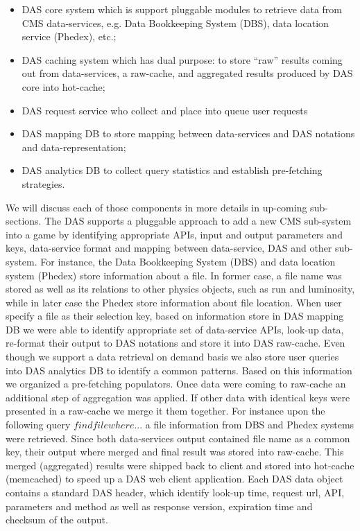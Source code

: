 \documentclass[a4paper]{jpconf}
\begin{document}
\begin{itemize}
\item DAS core system which is support pluggable modules to retrieve data from
CMS data-services, e.g. Data Bookkeeping System (DBS), data location service (Phedex),
etc.;
\item DAS caching system which has dual purpose: to store ``raw'' results coming
out from data-services, a raw-cache, and aggregated results produced by DAS core into
hot-cache;
\item DAS request service who collect and place into queue user requests
\item DAS mapping DB to store mapping between data-services and DAS notations and
data-representation;
\item DAS analytics DB to collect query statistics and establish pre-fetching 
strategies.
\end{itemize}
We will discuss each of those components in more details in up-coming sub-sections.
The DAS supports a pluggable approach to add a new CMS sub-system into a game by
identifying appropriate APIs, input and output parameters and keys, data-service
format and mapping between data-service, DAS and other sub-system. For instance,
the Data Bookkeeping System (DBS) and data location system (Phedex) store information about
a file. In former case, a file name was stored as well as its relations to other physics 
objects, such as run and luminosity, while in later case the Phedex store information 
about file location. When user specify a file as their selection key, based on
information store in DAS mapping DB we were able to identify appropriate set of
data-service APIs, look-up data, re-format their output to DAS notations and
store it into DAS raw-cache. Even though we support a data retrieval on demand
basis we also store user queries into DAS analytics DB to identify
a common patterns. Based on this information we organized a pre-fetching
populators. Once data were coming to raw-cache an additional step of
aggregation was applied. If other data with identical keys were presented in
a raw-cache we merge it them together. For instance upon the following query
$find file where ... $ a file information from DBS and Phedex systems were
retrieved. Since both data-services output contained file name as a common
key, their output where merged and final result was stored into raw-cache.
This merged (aggregated) results were shipped back to client and stored into
hot-cache (memcached) to speed up a DAS web client application. Each DAS data
object contains a standard DAS header, which identify look-up time,
request url, API, parameters and method as well as response version, expiration
time and checksum of the output. 
\end{document}
